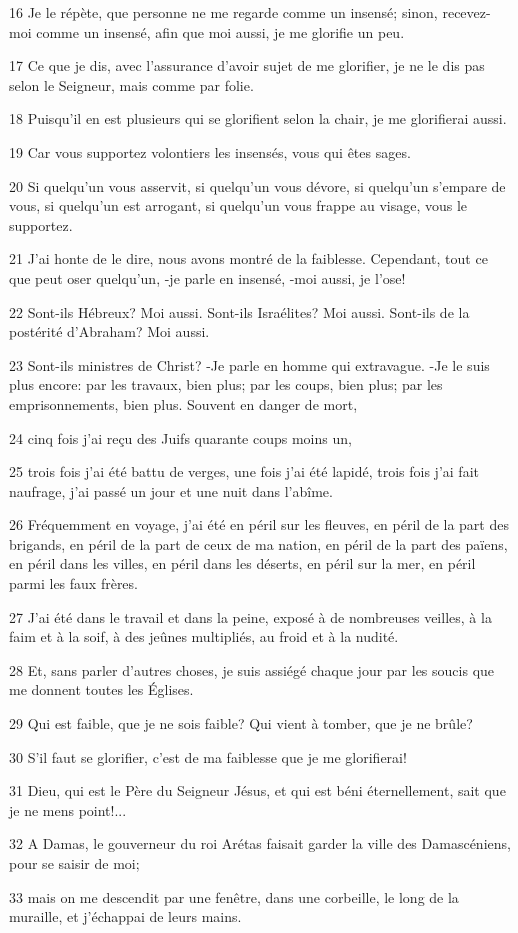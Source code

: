 \par 16 Je le répète, que personne ne me regarde comme un insensé; sinon, recevez-moi comme un insensé, afin que moi aussi, je me glorifie un peu.
\par 17 Ce que je dis, avec l'assurance d'avoir sujet de me glorifier, je ne le dis pas selon le Seigneur, mais comme par folie.
\par 18 Puisqu'il en est plusieurs qui se glorifient selon la chair, je me glorifierai aussi.
\par 19 Car vous supportez volontiers les insensés, vous qui êtes sages.
\par 20 Si quelqu'un vous asservit, si quelqu'un vous dévore, si quelqu'un s'empare de vous, si quelqu'un est arrogant, si quelqu'un vous frappe au visage, vous le supportez.
\par 21 J'ai honte de le dire, nous avons montré de la faiblesse. Cependant, tout ce que peut oser quelqu'un, -je parle en insensé, -moi aussi, je l'ose!
\par 22 Sont-ils Hébreux? Moi aussi. Sont-ils Israélites? Moi aussi. Sont-ils de la postérité d'Abraham? Moi aussi.
\par 23 Sont-ils ministres de Christ? -Je parle en homme qui extravague. -Je le suis plus encore: par les travaux, bien plus; par les coups, bien plus; par les emprisonnements, bien plus. Souvent en danger de mort,
\par 24 cinq fois j'ai reçu des Juifs quarante coups moins un,
\par 25 trois fois j'ai été battu de verges, une fois j'ai été lapidé, trois fois j'ai fait naufrage, j'ai passé un jour et une nuit dans l'abîme.
\par 26 Fréquemment en voyage, j'ai été en péril sur les fleuves, en péril de la part des brigands, en péril de la part de ceux de ma nation, en péril de la part des païens, en péril dans les villes, en péril dans les déserts, en péril sur la mer, en péril parmi les faux frères.
\par 27 J'ai été dans le travail et dans la peine, exposé à de nombreuses veilles, à la faim et à la soif, à des jeûnes multipliés, au froid et à la nudité.
\par 28 Et, sans parler d'autres choses, je suis assiégé chaque jour par les soucis que me donnent toutes les Églises.
\par 29 Qui est faible, que je ne sois faible? Qui vient à tomber, que je ne brûle?
\par 30 S'il faut se glorifier, c'est de ma faiblesse que je me glorifierai!
\par 31 Dieu, qui est le Père du Seigneur Jésus, et qui est béni éternellement, sait que je ne mens point!...
\par 32 A Damas, le gouverneur du roi Arétas faisait garder la ville des Damascéniens, pour se saisir de moi;
\par 33 mais on me descendit par une fenêtre, dans une corbeille, le long de la muraille, et j'échappai de leurs mains.

